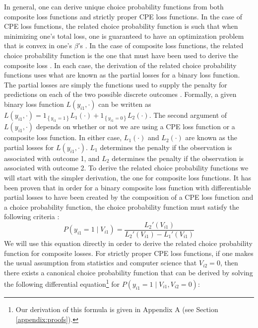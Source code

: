 In general, one can derive unique choice probability functions from both composite loss functions and strictly proper CPE loss functions. In the case of CPE loss functions, the related choice probability function is such that when minimizing one's total loss, one is guaranteed to have an optimization problem that is convex in one's $\beta$'s \citep{buja_loss_2005, reid_composite_2010}. In the case of composite loss functions, the related choice probability function is the one that must have been used to derive the composite loss \citep{reid_composite_2010}. In each case, the derivation of the related choice probability functions uses what are known as the partial losses for a binary loss function. The partial losses are simply the functions used to supply the penalty for predictions on each of the two possible discrete outcomes \citep{buja_loss_2005, reid_composite_2010}. Formally, a given binary loss function $L \left( y_{i1}, \cdot \right)$ can be written as $L \left( y_{i1}, \cdot \right) = 1_{\left\lbrace y_{i1} = 1 \right\rbrace} L_1 \left( \cdot \right) + 1_{\left\lbrace y_{i1} = 0 \right\rbrace} L_2 \left( \cdot \right)$. The second argument of $L \left( y_{i1}, \cdot \right)$ depends on whether or not we are using a CPE loss function or a composite loss function. In either case, $L_1 \left( \cdot \right)$ and $L_2 \left( \cdot \right)$ are known as the partial losses for $L \left( y_{i1}, \cdot \right)$. $L_1$ determines the penalty if the observation is associated with outcome 1, and $L_2$ determines the penalty if the observation is associated with outcome 2. To derive the related choice probability functions we will start with the simpler derivation, the one for composite loss functions. It has been proven that in order for a binary composite loss function with differentiable partial losses to have been created by the composition of a CPE loss function and a choice probability function, the choice probability function must satisfy the following criteria \citep[Eq. 11]{reid_composite_2010}:
\begin{equation}
\label{eq:composite_loss_to_binary_prob}
P \left( y_{i1} = 1 \mid V_{i1} \right) = \frac{ L_{2}' \left( V_{i1} \right) }{ L_{2}' \left( V_{i1} \right) - L_{1}' \left( V_{i1} \right) }
\end{equation}
We will use this equation directly in order to derive the related choice probability function for composite losses. For strictly proper CPE loss functions, if one makes the usual assumption from statistics and computer science that $V_{i2} = 0$, then there exists a canonical choice probability function that can be derived by solving the following differential equation\footnote{Our derivation of this formula is given in Appendix A (see Section \ref{appendix:proofs}).} for $P \left( y_{i1} = 1 \mid V_{i1}, V_{i2} = 0 \right)$:
